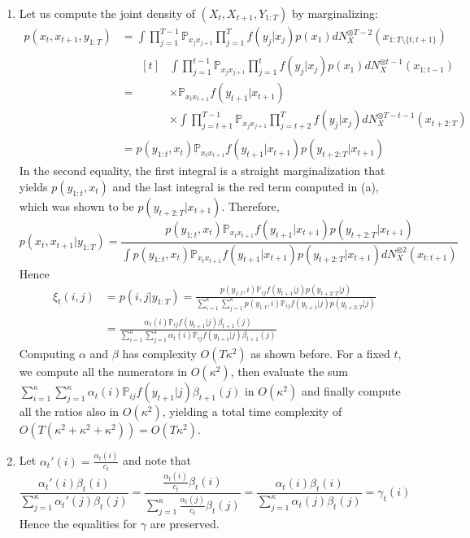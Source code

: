\documentclass[a4paper,11pt, hidelinks]{article}
\begin{document}
\begin{enumerate}[label=(\alph*)]
	\item Let us compute the joint density of $(X_t,X_{t+1},Y_{1:T})$ by marginalizing: 
	$$\begin{aligned}
		p(x_t,x_{t+1},y_{1:T}) &= \int \prod_{j=1}^{T-1}\mathbb P_{x_{j} x_{j+1}} \prod_{j=1}^{T}f(y_j|x_j)p(x_1) dN_X^{\otimes T-2}(x_{1:T\setminus \{t,t+1\}})\\
		&= \begin{aligned}[t]
			&\int \prod_{j=1}^{t-1}\mathbb P_{x_{j} x_{j+1}} \prod_{j=1}^{t}f(y_j|x_j)p(x_1) dN_X^{\otimes t-1}(x_{1:t-1})\\
			&\times \mathbb P_{x_t x_{t+1}} f(y_{t+1}|x_{t+1})\\
			&\times \int \prod_{j=t+1}^{T-1}\mathbb P_{x_{j} x_{j+1}} \prod_{j=t+2}^{T}f(y_j|x_j) dN_X^{\otimes T-t-1}(x_{t+2:T})
		\end{aligned}\\
		&= p(y_{1:t},x_t) \mathbb P_{x_t x_{t+1}} f(y_{t+1}|x_{t+1}) p(y_{t+2:T}|x_{t+1})
	\end{aligned}$$
	In the second equality, the first integral is a straight marginalization that yields $p(y_{1:t},x_t)$ and the last integral is the red term computed in (a), which was shown to be $p(y_{t+2:T}|x_{t+1})$. Therefore, 
	$$p(x_t,x_{t+1}|y_{1:T}) = \frac{p(y_{1:t},x_t) \mathbb P_{x_t x_{t+1}} f(y_{t+1}|x_{t+1}) p(y_{t+2:T}|x_{t+1})}{\int p(y_{1:t},x_t) \mathbb P_{x_t x_{t+1}} f(y_{t+1}|x_{t+1}) p(y_{t+2:T}|x_{t+1})dN_X^{\otimes 2}(x_{t:t+1})}$$
	Hence 
	$$\begin{aligned}\xi_t(i,j) &= p(i,j|y_{1:T}) = \frac{p(y_{1:t},i) \mathbb P_{ij} f(y_{t+1}|j) p(y_{t+2:T}|j)}{\sum_{i=1}^\kappa \sum_{j=1}^\kappa p(y_{1:t},i) \mathbb P_{ij} f(y_{t+1}|j) p(y_{t+2:T}|j)}\\
	&= \frac{\alpha_t(i) \mathbb P_{ij} f(y_{t+1}|j) \beta_{t+1}(j)}{\sum_{i=1}^\kappa \sum_{j=1}^\kappa \alpha_t(i) \mathbb P_{ij} f(y_{t+1}|j) \beta_{t+1}(j)}
	\end{aligned}$$
	Computing $\alpha$ and $\beta$ has complexity $O(T\kappa^2)$ as shown before. For a fixed $t$, we compute all the numerators in $O(\kappa^2)$, then evaluate the sum $\sum_{i=1}^\kappa \sum_{j=1}^\kappa \alpha_t(i) \mathbb P_{ij} f(y_{t+1}|j) \beta_{t+1}(j)$ in $O(\kappa^2)$ and finally compute all the ratios also in $O(\kappa^2)$, yielding a total time complexity of $O(T(\kappa^2+\kappa^2+\kappa^2)) = O(T\kappa^2)$.

	\item Let $\alpha_t'(i) = \frac{\alpha_t(i)}{c_t}$ and note that $$\frac{\alpha_t'(i)\beta_t(i)}{\sum_{j=1}^\kappa \alpha_t'(j)\beta_t(j)} = \frac{\frac{\alpha_t(i)}{c_t}\beta_t(i)}{\sum_{j=1}^\kappa \frac{\alpha_t(j)}{c_t}\beta_t(j)}=\frac{\alpha_t(i)\beta_t(i)}{\sum_{j=1}^\kappa \alpha_t(j)\beta_t(j)} = \gamma_t(i) $$
	Hence the equalities for $\gamma$ are preserved.
\end{enumerate}
\end{document}
